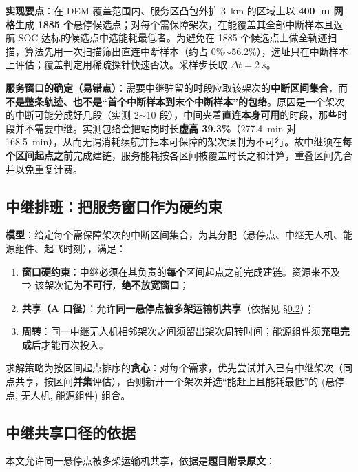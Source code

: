 \textbf{实现要点}：在 DEM 覆盖范围内、服务区凸包外扩 \SI{3}{km} 的区域上以 \textbf{\SI{400}{m} 网格}生成 \textbf{1885 个}悬停候选点；对每个需保障架次，在能覆盖其全部中断样本且返航 SOC 达标的候选点中选能耗最低者。为避免在 1885 个候选点上做全轨迹扫描，算法先用一次扫描筛出直连中断样本（约占 0\%$\sim$56.2\%），选址只在中断样本上评估；覆盖判定用稀疏探针快速否决。采样步长取 $\Delta t=\SI{2}{s}$。

\textbf{服务窗口的确定（易错点）}：需要中继驻留的时段应取该架次的\textbf{中断区间集合}，而\textbf{不是整条轨迹、也不是“首个中断样本到末个中断样本”的包络}。原因是一个架次的中断可能分成好几段（实测 2$\sim$10 段），中间夹着\textbf{直连本身可用}的时段，那些时段并不需要中继。实测包络会把站岗时长\textbf{虚高 39.3\%}（\SI{277.4}{min} 对 \SI{168.5}{min}），从而无谓消耗续航并把本可保障的架次误判为不可行。故中继须在\textbf{每个区间起点之前}完成建链，服务能耗按各区间被覆盖时长之和计算，重叠区间先合并以免重复计费。

\subsection{中继排班：把服务窗口作为硬约束}

\textbf{模型}：给定每个需保障架次的中断区间集合，为其分配（悬停点、中继无人机、能源组件、起飞时刻），满足：

\begin{enumerate}[label=(\arabic*),leftmargin=2em]
	\item \textbf{窗口硬约束}：中继必须在其负责的\textbf{每个}区间起点之前完成建链。资源来不及 ⇒ 该架次记为\textbf{不可行}，\textbf{绝不放宽窗口}；
	\item \textbf{共享（A 口径）}：允许\textbf{同一悬停点被多架运输机共享}（依据见 \S\ref{sec:share}）；
	\item \textbf{周转}：同一中继无人机相邻架次之间须留出架次周转时间；能源组件须\textbf{充电完成}后才能再次投入。
\end{enumerate}

求解策略为按区间起点排序的\textbf{贪心}：对每个需求，优先尝试并入已有中继架次（同点共享，按区间\textbf{并集}评估），否则新开一个架次并选“能赶上且能耗最低”的 (悬停点, 无人机, 能源组件) 组合。

\subsection{中继共享口径的依据}\label{sec:share}

本文允许同一悬停点被多架运输机共享，依据是\textbf{题目附录原文}：

